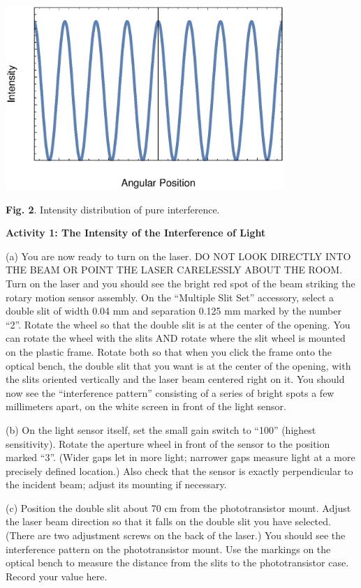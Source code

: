 \vspace{-0.10cm}
{\centering \includegraphics[height=2.75in]{diffraction/diffractionFig1.eps} \par}
\vspace{0.1cm}

{\centering \textbf{Fig. 2}. Intensity distribution of pure interference.\par}

\textbf{Activity 1: The Intensity of the Interference of Light }

(a) You are now ready to turn on the laser. DO NOT LOOK DIRECTLY INTO
THE BEAM OR POINT THE LASER CARELESSLY ABOUT THE ROOM. Turn on the
laser and you should see the bright red spot of the beam striking
the rotary motion sensor assembly. On the ``Multiple Slit Set'' accessory, 
select a double slit of width 0.04 mm and separation 0.125 mm marked by the number “2”. 
Rotate the 
wheel so that the double slit is at the center of the opening.
You can rotate the wheel with the slits AND rotate where the slit wheel is mounted
on the plastic frame. Rotate both so that when you click the frame onto the optical bench, the double slit that
you want is at the center of the opening, with the slits oriented vertically and the laser beam centered right on
it. You should now see the “interference pattern” consisting of a series of bright spots a few millimeters apart,
on the white screen in front of the light sensor.

(b) On the light sensor itself, set the small gain switch to “100” (highest sensitivity). Rotate the aperture wheel
in front of the sensor to the position marked “3”. (Wider gaps let in more light; narrower gaps measure light
at a more precisely defined location.) Also check that the sensor is exactly perpendicular to the incident beam;
adjust its mounting if necessary.

(c) Position the double slit about 70 cm from the phototransistor mount. Adjust 
the laser beam direction so that it falls on the double slit you have selected. 
(There are two adjustment screws on the back of the laser.) 
You should see the interference pattern on the phototransistor mount. 
Use the markings on the optical bench to measure the distance from the slits
to the phototransistor case.
Record your value here.
\vspace{10mm}

